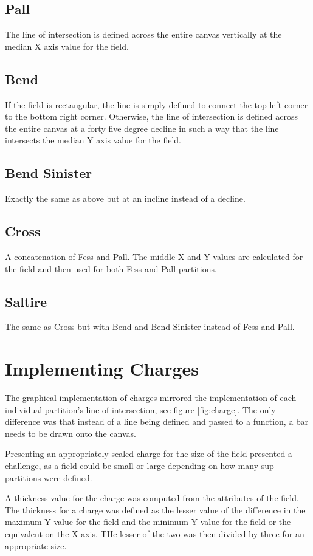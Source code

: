 \subsection{Pall}
The line of intersection is defined across the entire canvas vertically at the median X axis value for the field. 
\subsection{Bend}
If the field is rectangular, the line is simply defined to connect the top left corner to the bottom right corner.  Otherwise, the line of intersection is defined across the entire canvas at a forty five degree decline in such a way that the line intersects the median Y axis value for the field.
\subsection{Bend Sinister}
Exactly the same as above but at an incline instead of a decline.
\subsection{Cross}
A concatenation of Fess and Pall. The middle X and Y values are calculated for the field and then used for both Fess and Pall partitions.
\subsection{Saltire}
The same as Cross but with Bend and Bend Sinister instead of Fess and Pall.



\section{Implementing Charges}
The graphical implementation of charges mirrored the implementation of each individual partition's line of intersection, see figure \ref{fig:charge}.  The only difference was that instead of  a line being defined and passed to a function,  a bar needs to be drawn onto the canvas.  

Presenting an appropriately scaled charge for the size of the field presented a challenge, as a field could be small or large depending on how many sup-partitions were defined.

A thickness value for the charge was computed from the attributes of the field.  The thickness for a charge was defined as the lesser value of the difference in the maximum Y value for the field and the minimum Y value for the field or the equivalent on the X axis.  THe lesser of the two was then divided by three for an appropriate size. 

